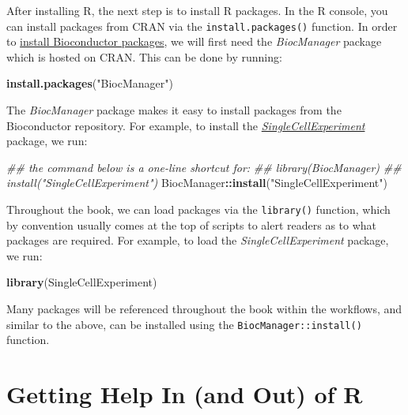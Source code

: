 \documentclass[]{book}
\newenvironment{Shaded}{\begin{snugshade}}{\end{snugshade}}
\newcommand{\CommentTok}[1]{\textcolor[rgb]{0.56,0.35,0.01}{\textit{#1}}}
\newcommand{\KeywordTok}[1]{\textcolor[rgb]{0.13,0.29,0.53}{\textbf{#1}}}
\newcommand{\NormalTok}[1]{#1}
\newcommand{\OperatorTok}[1]{\textcolor[rgb]{0.81,0.36,0.00}{\textbf{#1}}}
\newcommand{\StringTok}[1]{\textcolor[rgb]{0.31,0.60,0.02}{#1}}
\begin{document}
After installing R, the next step is to install R packages. In the R console, you can install packages from CRAN via the \texttt{install.packages()} function. In order to \href{https://www.bioconductor.org/install/}{install Bioconductor packages}, we will first need the \emph{BiocManager} package which is hosted on CRAN. This can be done by running:

\begin{Shaded}
\begin{Highlighting}[]
\KeywordTok{install.packages}\NormalTok{(}\StringTok{"BiocManager"}\NormalTok{)}
\end{Highlighting}
\end{Shaded}

The \emph{BiocManager} package makes it easy to install packages from the Bioconductor repository. For example, to install the \href{https://bioconductor.org/packages/release/bioc/html/SingleCellExperiment.html}{\emph{SingleCellExperiment}} package, we run:

\begin{Shaded}
\begin{Highlighting}[]
\CommentTok{## the command below is a one-line shortcut for:}
\CommentTok{## library(BiocManager)}
\CommentTok{## install("SingleCellExperiment")}
\NormalTok{BiocManager}\OperatorTok{::}\KeywordTok{install}\NormalTok{(}\StringTok{"SingleCellExperiment"}\NormalTok{)}
\end{Highlighting}
\end{Shaded}

Throughout the book, we can load packages via the \texttt{library()} function, which by convention usually comes at the top of scripts to alert readers as to what packages are required. For example, to load the \emph{SingleCellExperiment} package, we run:

\begin{Shaded}
\begin{Highlighting}[]
\KeywordTok{library}\NormalTok{(SingleCellExperiment)}
\end{Highlighting}
\end{Shaded}

Many packages will be referenced throughout the book within the workflows, and similar to the above, can be installed using the \texttt{BiocManager::install()} function.

\hypertarget{getting-help-in-and-out-of-r}{%
\section{Getting Help In (and Out) of R}\label{getting-help-in-and-out-of-r}}
\end{document}
